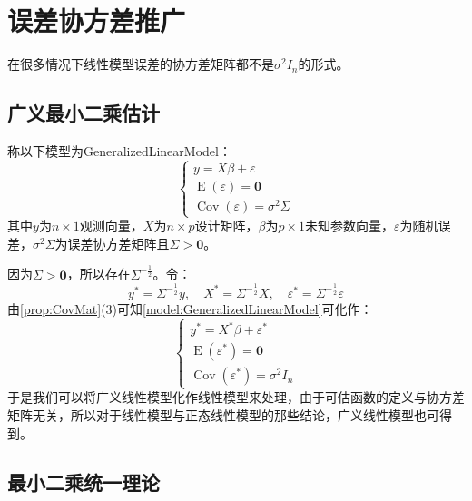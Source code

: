 \section{误差协方差推广}
在很多情况下线性模型误差的协方差矩阵都不是$\sigma^2I_n$的形式。
\subsection{广义最小二乘估计}
\begin{definition}\label{model:GeneralizedLinearModel}
	称以下模型为\gls{GeneralizedLinearModel}：
	\begin{equation*}
		\begin{cases}
			y=X\beta+\varepsilon \\
			\operatorname{E}(\varepsilon)=\mathbf{0} \\
			\operatorname{Cov}(\varepsilon)=\sigma^2\Sigma
		\end{cases}
	\end{equation*}
	其中$y$为$n\times 1$观测向量，$X$为$n\times p$设计矩阵，$\beta$为$p\times 1$未知参数向量，$\varepsilon$为随机误差，$\sigma^2\Sigma$为误差协方差矩阵且$\Sigma>\mathbf{0}$。
\end{definition}
\begin{derivation}
	因为$\Sigma>\mathbf{0}$，所以存在$\Sigma^{-\frac{1}{2}}$。令：
	\begin{equation*}
		y^*=\Sigma^{-\frac{1}{2}}y,\quad X^*=\Sigma^{-\frac{1}{2}}X,\quad\varepsilon^*=\Sigma^{-\frac{1}{2}}\varepsilon
	\end{equation*}
	由\cref{prop:CovMat}(3)可知\cref{model:GeneralizedLinearModel}可化作：
	\begin{equation*}
		\begin{cases}
			y^*=X^*\beta+\varepsilon^* \\
			\operatorname{E}(\varepsilon^*)=\mathbf{0} \\
			\operatorname{Cov}(\varepsilon^*)=\sigma^2I_n
		\end{cases}
	\end{equation*}
	于是我们可以将广义线性模型化作线性模型来处理，由于可估函数的定义与协方差矩阵无关，所以对于线性模型与正态线性模型的那些结论，广义线性模型也可得到。
\end{derivation}

\subsection{最小二乘统一理论}